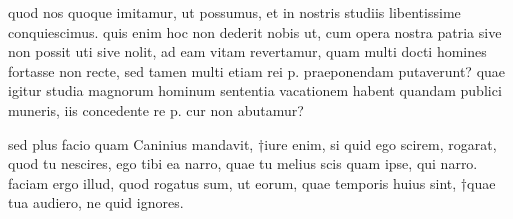  quod nos quoque imitamur, ut possumus, et in nostris studiis libentissime conquiescimus. quis enim hoc non dederit nobis ut, cum opera nostra patria sive non possit uti sive nolit, ad eam vitam revertamur, quam multi docti homines fortasse non recte, sed tamen multi etiam rei p. praeponendam putaverunt? quae igitur studia magnorum hominum sententia vacationem habent quandam publici muneris, iis concedente re p. cur non abutamur?

 sed plus facio quam Caninius mandavit, †iure enim, si quid ego scirem, rogarat, quod tu nescires, ego tibi ea narro, quae tu melius scis quam ipse, qui narro. faciam ergo illud, quod rogatus sum, ut eorum, quae temporis huius sint, †quae tua audiero, ne quid ignores.
